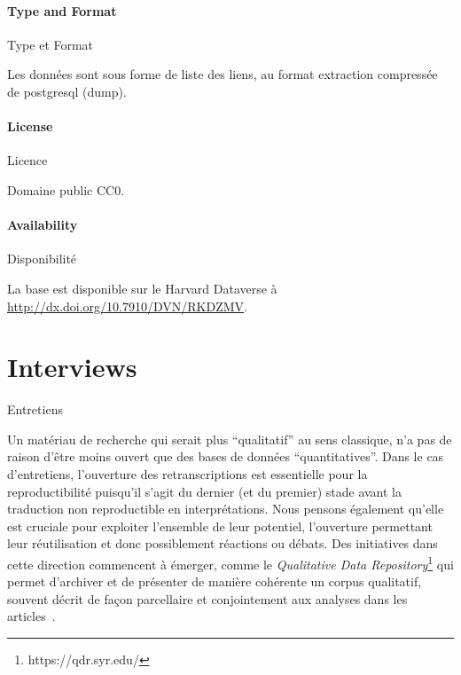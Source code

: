 \paragraph{Type and Format}{Type et Format}

Les données sont sous forme de liste des liens, au format extraction compressée de postgresql (dump).

\paragraph{License}{Licence}

Domaine public CC0.

\paragraph{Availability}{Disponibilité}

La base est disponible sur le Harvard Dataverse à \url{http://dx.doi.org/10.7910/DVN/RKDZMV}.











\section{Interviews}{Entretiens}

\label{app:sec:interviews}


Un matériau de recherche qui serait plus ``qualitatif'' au sens classique, n'a pas de raison d'être moins ouvert que des bases de données ``quantitatives''. Dans le cas d'entretiens, l'ouverture des retranscriptions est essentielle pour la reproductibilité puisqu'il s'agit du dernier (et du premier) stade avant la traduction non reproductible en interprétations. Nous pensons également qu'elle est cruciale pour exploiter l'ensemble de leur potentiel, l'ouverture permettant leur réutilisation et donc possiblement réactions ou débats. Des initiatives dans cette direction commencent à émerger, comme le \emph{Qualitative Data Repository}\footnote{https://qdr.syr.edu/} qui permet d'archiver et de présenter de manière cohérente un corpus qualitatif, souvent décrit de façon parcellaire et conjointement aux analyses dans les articles~\cite{elman_kapiszewski_2018}.


